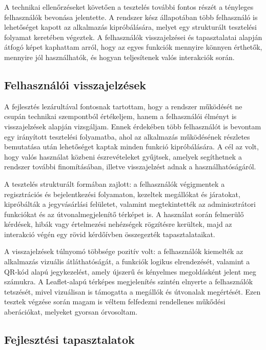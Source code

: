 A technikai ellenőrzéseket követően a tesztelés további fontos részét a tényleges felhasználók bevonása jelentette. A rendszer kész állapotában több felhasználó is lehetőséget kapott az alkalmazás kipróbálására, melyet egy strukturált tesztelési folyamat keretében végeztek. A felhasználók visszajelzései és tapasztalatai alapján átfogó képet kaphattam arról, hogy az egyes funkciók mennyire könnyen érthetők, mennyire jól használhatók, és hogyan teljesítenek valós interakciók során.

\subsection{Felhasználói visszajelzések}

A fejlesztés lezárultával fontosnak tartottam, hogy a rendszer működését ne csupán technikai szempontból értékeljem, hanem a felhasználói élményt is visszajelzések alapján vizsgáljam. Ennek érdekében több felhasználót is bevontam egy irányított tesztelési folyamatba, ahol az alkalmazás működésének részletes bemutatása után lehetőséget kaptak minden funkció kipróbálására. A cél az volt, hogy valós használat közbeni észrevételeket gyűjtsek, amelyek segíthetnek a rendszer további finomításában, illetve visszajelzést adnak a használhatóságáról.

A tesztelés strukturált formában zajlott: a felhasználók végigmentek a regisztrációs és bejelentkezési folyamaton, kezeltek megállókat és járatokat, kipróbálták a jegyvásárlási felületet, valamint megtekintették az adminisztrátori funkciókat és az útvonalmegjelenítő térképet is. A használat során felmerülő kérdések, hibák vagy értelmezési nehézségek rögzítésre kerültek, majd az interakció végén egy rövid kérdőívben összegezték tapasztalataikat.

A visszajelzések túlnyomó többsége pozitív volt: a felhasználók kiemelték az alkalmazás vizuális átláthatóságát, a funkciók logikus elrendezését, valamint a QR-kód alapú jegykezelést, amely újszerű és kényelmes megoldásként jelent meg számukra. A Leaflet-alapú térképes megjelenítés szintén elnyerte a felhasználók tetszését, mivel vizuálisan is támogatta a megállók és útvonalak megértését. Ezen tesztek végzése során magam is véltem felfedezni rendellenes műkődési aberációkat, melyeket gyorsan órvosoltam.


\subsection{Fejlesztési tapasztalatok}

